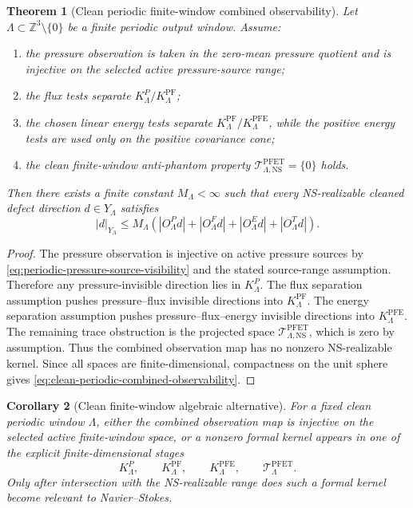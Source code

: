 \documentclass[11pt]{article}
\numberwithin{equation}{section}
\theoremstyle{plain}
\newtheorem{theorem}{Theorem}[section]
\newtheorem{corollary}[theorem]{Corollary}
\theoremstyle{definition}
\theoremstyle{remark}
\newcommand{\Z}{\mathbb Z}
\newcommand{\NS}{\mathrm{NS}}
\newcommand{\PF}{\mathrm{PF}}
\newcommand{\PFE}{\mathrm{PFE}}
\newcommand{\PFET}{\mathrm{PFET}}
\begin{document}
\begin{theorem}[Clean periodic finite-window combined observability]
\label{thm:clean-periodic-combined-observability}
Let \(\Lambda\subset\Z^3\setminus\{0\}\) be a finite periodic output window.
Assume:
\begin{enumerate}
\item the pressure observation is taken in the zero-mean pressure quotient and
is injective on the selected active pressure-source range;
\item the flux tests separate \(K^P_\Lambda/K^{\PF}_\Lambda\);
\item the chosen linear energy tests separate
\(K^{\PF}_\Lambda/K^{\PFE}_\Lambda\), while the positive energy tests are used
only on the positive covariance cone;
\item the clean finite-window anti-phantom property
\(\mathcal T^{\PFET}_{\Lambda,\NS}=\{0\}\) holds.
\end{enumerate}
Then there exists a finite constant \(M_\Lambda<\infty\) such that every
NS-realizable cleaned defect direction \(d\in Y_\Lambda\) satisfies
\begin{equation}
        |d|_{Y_\Lambda}
        \le
        M_\Lambda
        \left(
            |O^P_\Lambda d|
            +|O^F_\Lambda d|
            +|O^E_\Lambda d|
            +|O^T_\Lambda d|
        \right).
        \label{eq:clean-periodic-combined-observability}
\end{equation}
\end{theorem}

\begin{proof}
The pressure observation is injective on active pressure sources by
\eqref{eq:periodic-pressure-source-visibility} and the stated source-range
assumption.  Therefore any pressure-invisible direction lies in
\(K^P_\Lambda\).  The flux separation assumption pushes pressure--flux invisible
directions into \(K^{\PF}_\Lambda\).  The energy separation assumption pushes
pressure--flux--energy invisible directions into \(K^{\PFE}_\Lambda\).  The
remaining trace obstruction is the projected space
\(\mathcal T^{\PFET}_{\Lambda,\NS}\), which is zero by assumption.  Thus the
combined observation map has no nonzero NS-realizable kernel.  Since all spaces
are finite-dimensional, compactness on the unit sphere gives
\eqref{eq:clean-periodic-combined-observability}.
\end{proof}

\begin{corollary}[Clean finite-window algebraic alternative]
\label{cor:clean-finite-window-algebraic}
For a fixed clean periodic window \(\Lambda\), either the combined observation
map is injective on the selected active finite-window space, or a nonzero formal
kernel appears in one of the explicit finite-dimensional stages
\[
        K^P_\Lambda,
        \qquad
        K^{\PF}_\Lambda,
        \qquad
        K^{\PFE}_\Lambda,
        \qquad
        \mathcal T^{\PFET}_\Lambda.
\]
Only after intersection with the NS-realizable range does such a formal kernel
become relevant to Navier--Stokes.
\end{corollary}
\end{document}
